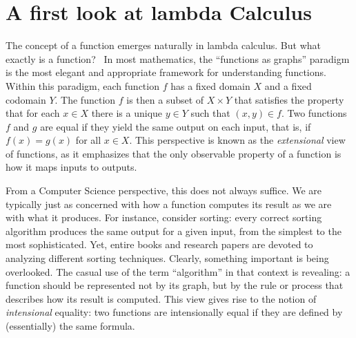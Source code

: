 
 



\section{A first look at lambda Calculus}





The concept of a function emerges naturally in lambda calculus. But what exactly is a function?  In most mathematics, the ``functions as graphs'' paradigm is the most elegant and appropriate framework for understanding functions. Within this paradigm, each function $f$ has a fixed domain $X$ and a fixed codomain $Y$. The function $f$ is then a subset of $X \times Y$ that satisfies the property that for each $x \in X$ there is a unique $y \in Y$ such that $(x,y) \in f$. Two functions $f$ and $g$ are equal if they yield the same output on each input, that is, if $f(x) = g(x)$ for all $x \in X$. This perspective is known as the \emph{extensional} view of functions, as it emphasizes that the only observable property of a function is how it maps inputs to outputs.

From a Computer Science perspective, this does not always suffice. We are typically just as concerned with how a function computes its result as we are with what it produces. For instance, consider sorting: every correct sorting algorithm produces the same output for a given input, from the simplest to the most sophisticated. Yet, entire books and research papers are devoted to analyzing different sorting techniques. Clearly, something important is being overlooked. The casual use of the term ``algorithm'' in that context is revealing: a function should be represented not by its graph, but by the rule or process that describes how its result is computed. This view gives rise to the notion of \emph{intensional} equality: two functions are intensionally equal if they are defined by (essentially) the same formula.

